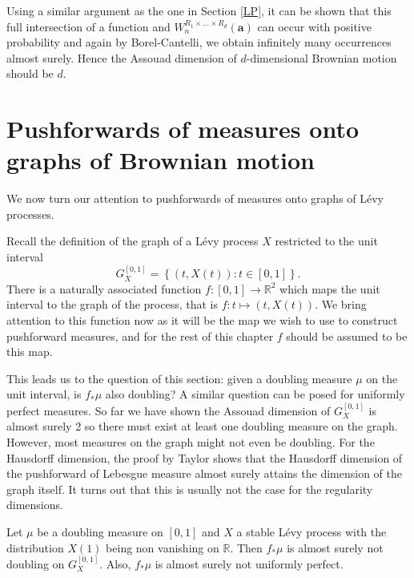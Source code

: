 Using a similar argument as the one in Section \ref{LP}, it can be shown that this full intersection of a function and $W_{n}^{R_1\times\dots\times R_d}(\mathbf{a})$ can occur with positive probability and again by Borel-Cantelli, we obtain infinitely many occurrences almost surely. Hence the Assouad dimension of $d$-dimensional Brownian motion should be $d$. 















\section{Pushforwards of measures onto graphs of Brownian motion}


We now turn our attention to pushforwards of measures onto graphs of L\'evy processes.


Recall the definition of the graph of a L\'evy process $X$ restricted to the unit interval
\[
G_X^{[0,1]} = \left\{ (t,X(t)) \colon t \in [0,1] \right\}.
\]
There is a naturally associated function $f: [0,1] \rightarrow \mathbb{R}^2$ which maps the unit interval to the graph of the process, that is $f\colon t \mapsto (t,X(t))$. We bring attention to this function now as it will be the map we wish to use to construct pushforward measures, and for the rest of this chapter $f$ should be assumed to be this map. 





This leads us to the question of this section: given a doubling measure $\mu$ on the unit interval, is $f_*\mu$ also doubling? A similar question can be posed for uniformly perfect measures. So far we have shown the Assouad dimension of $G_X^{[0,1]}$ is almost surely 2 so there must exist at least one doubling measure on the graph. However, most measures on the graph might not even be doubling. For the Hausdorff dimension, the proof by Taylor shows that the Hausdorff dimension of the pushforward of Lebesgue measure almost surely attains the dimension of the graph itself. It turns out that this is usually not the case for the regularity dimensions.

\begin{theorem}\label{brownianthm}
	Let $\mu$ be a doubling measure on $[0,1]$ and $X$ a stable L\'evy process with the distribution $X(1)$ being non vanishing on $\mathbb{R}$. Then $f_*\mu$ is almost surely not doubling on $G_X^{[0,1]}$. Also, $f_*\mu$ is almost surely not uniformly perfect.
\end{theorem}


